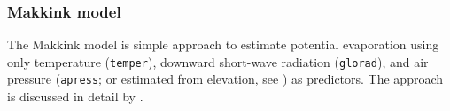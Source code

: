 %
%
%
%
%


\subsubsection{Makkink model} \label{sec:et:makkink}

The Makkink model is simple approach to estimate potential evaporation using only temperature (\verb!temper!), downward short-wave radiation (\verb!glorad!), and air pressure (\verb!apress!; or estimated from elevation, see ) as predictors. The approach is discussed in detail by \citet{deBruin1987, Feddes1987, Hiemstra2011}.

